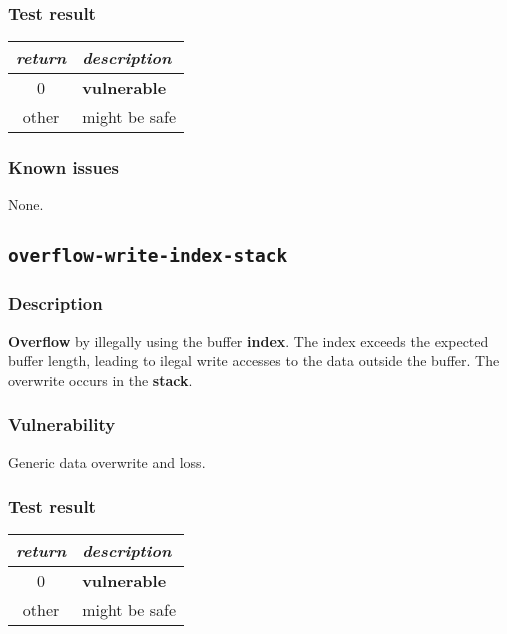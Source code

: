 \documentclass[a4paper]{book}
\begin{document}
\subsubsection{Test result}
\begin{tabular}{cl}
  \toprule
  \emph{return}  & \emph{description} \\
  \midrule
  0              & \textbf{vulnerable} \\
  other          & might be safe \\
  \bottomrule
\end{tabular}

\subsubsection{Known issues}

None.

\newpage

\subsection{\texttt{overflow-write-index-stack}}\label{test-overflow-write-index-stack}

\subsubsection{Description}

\textbf{Overflow} by illegally using the buffer \textbf{index}.
The index exceeds the expected buffer length,
leading to ilegal write accesses to the data outside the buffer.
The overwrite occurs in the \textbf{stack}.

\subsubsection{Vulnerability}
Generic data overwrite and loss.

\subsubsection{Test result}
\begin{tabular}{cl}
  \toprule
  \emph{return}  & \emph{description} \\
  \midrule
  0              & \textbf{vulnerable} \\
  other          & might be safe \\
  \bottomrule
\end{tabular}
\end{document}
